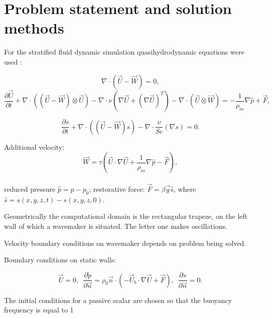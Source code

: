 \documentclass{article}
\begin{document}
\section{Problem statement and solution methods}

For the stratified fluid dynamic simulation quasihydrodynamic equations were used \cite{ElizarBook}: 

 \begin{equation}
     \nabla \cdot \left (\vec U - \vec W \right ) = 0,
     \label{eq:cont}
 \end{equation}
 \begin{equation}
     \frac{\partial \vec U}{\partial t}  + \nabla \cdot \left ( (\vec U - \vec W)\otimes \vec U  \right )
     -
     \nabla \cdot \nu \left ( \nabla \vec U + (\nabla \vec U)^T \right ) - \nabla \cdot \left  (   \vec U \otimes \vec W \right ) 
      = - \frac{1}{\rho_m} \nabla \hat p + \vec F,
      \label{eq:mom}
 \end{equation}
     
 \begin{equation}
     \frac{\partial s}{\partial t} + \nabla \cdot \left ( (\vec U - \vec W)s \right )
     - \nabla \cdot \frac{\nu}{Sc} \left ( \nabla s \right )=0.
     \label{eq:tr}
 \end{equation}


Additional velocity:  $$\vec W = \tau \left ( \vec U \cdot \nabla \vec U + \frac{1}{\rho_m} \nabla \hat p - \vec F  \right ),$$\\

reduced pressure $\hat p = p - p_0$; restorative force: $\vec{F}=\beta \vec{g} \hat s$, where $\hat s = s(x, y, z, t) - s(x, y, z, 0).$

Geometrically the computational domain is the rectangular trapeze, on the left wall of which a wavemaker is situated. The letter one makes oscillations. 

Velocity boundary conditions on wavemaker depends on problem being solved.

Boundary conditions on static walls:

\begin{equation}\label{eq:qhd_walls}
        \vec{U} = 0, \,\,\, \frac{\partial \tilde p}{ \partial \vec{n}} = \rho_0 \vec n \cdot \left ( -\vec U_b \cdot \nabla \vec U + \vec F \right), \,\,\, \frac{\partial s}{ \partial \vec{n}} = 0.
\end{equation}

The initial conditions for a passive scalar are chosen so that the buoyancy frequency is equal to 1
\end{document}
